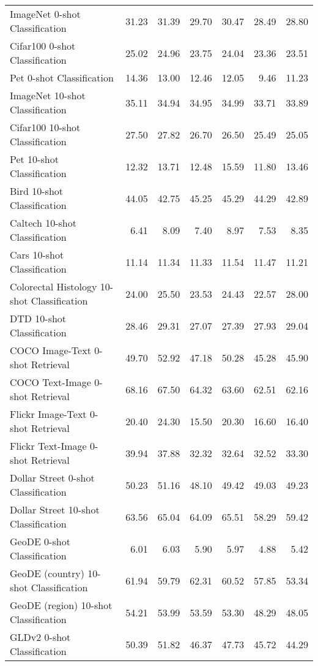 {\begin{longtable}{l|rr|rr|rr}
ImageNet 0-shot Classification & 31.23 & 31.39 & 29.70 & 30.47 & 28.49 & 28.80 \\
Cifar100 0-shot Classification & 25.02 & 24.96 & 23.75 & 24.04 & 23.36 & 23.51 \\
Pet 0-shot Classification & 14.36 & 13.00 & 12.46 & 12.05 & 9.46 & 11.23 \\
ImageNet 10-shot Classification & 35.11 & 34.94 & 34.95 & 34.99 & 33.71 & 33.89 \\
Cifar100 10-shot Classification & 27.50 & 27.82 & 26.70 & 26.50 & 25.49 & 25.05 \\
Pet 10-shot Classification & 12.32 & 13.71 & 12.48 & 15.59 & 11.80 & 13.46 \\
Bird 10-shot Classification & 44.05 & 42.75 & 45.25 & 45.29 & 44.29 & 42.89 \\
Caltech 10-shot Classification & 6.41 & 8.09 & 7.40 & 8.97 & 7.53 & 8.35 \\
Cars 10-shot Classification & 11.14 & 11.34 & 11.33 & 11.54 & 11.47 & 11.21 \\
Colorectal Histology 10-shot Classification & 24.00 & 25.50 & 23.53 & 24.43 & 22.57 & 28.00 \\
DTD 10-shot Classification & 28.46 & 29.31 & 27.07 & 27.39 & 27.93 & 29.04 \\
COCO Image-Text 0-shot Retrieval & 49.70 & 52.92 & 47.18 & 50.28 & 45.28 & 45.90 \\
COCO Text-Image 0-shot Retrieval & 68.16 & 67.50 & 64.32 & 63.60 & 62.51 & 62.16 \\
Flickr Image-Text 0-shot Retrieval & 20.40 & 24.30 & 15.50 & 20.30 & 16.60 & 16.40 \\
Flickr Text-Image 0-shot Retrieval & 39.94 & 37.88 & 32.32 & 32.64 & 32.52 & 33.30 \\
Dollar Street 0-shot Classification & 50.23 & 51.16 & 48.10 & 49.42 & 49.03 & 49.23 \\
Dollar Street 10-shot Classification & 63.56 & 65.04 & 64.09 & 65.51 & 58.29 & 59.42 \\
GeoDE 0-shot Classification & 6.01 & 6.03 & 5.90 & 5.97 & 4.88 & 5.42 \\
GeoDE (country) 10-shot Classification & 61.94 & 59.79 & 62.31 & 60.52 & 57.85 & 53.34 \\
GeoDE (region) 10-shot Classification & 54.21 & 53.99 & 53.59 & 53.30 & 48.29 & 48.05 \\
GLDv2 0-shot Classification & 50.39 & 51.82 & 46.37 & 47.73 & 45.72 & 44.29 \\

\end{longtable}}
